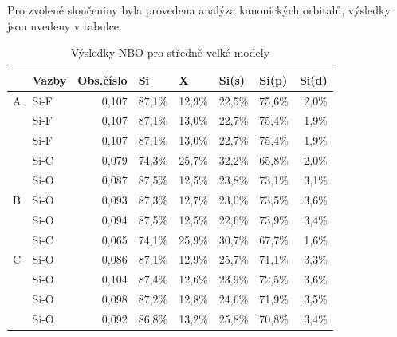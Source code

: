 \documentclass[
  digital, %
  table,   %
  lof,     %
  lot,     %
  oneside,
]{fithesis3}
\begin{document}
Pro zvolené sloučeniny byla provedena analýza kanonických orbitalů, výsledky jsou uvedeny v tabulce.
\begin{table}[htbp]
\caption{Výsledky NBO pro středně velké modely}
\begin{center}
\begin{tabular}{|l|l|r|r|r|r|r|r|}
\hline
 & Vazby & \multicolumn{1}{l|}{Obs.číslo} & \multicolumn{1}{l|}{Si} & \multicolumn{1}{l|}{X} & \multicolumn{1}{l|}{Si(s)} & \multicolumn{1}{l|}{Si(p)} & \multicolumn{1}{l|}{Si(d)} \\ \hline
A  & Si-F & 0,107 & 87,1\% & 12,9\% & 22,5\% & 75,6\% & 2,0\% \\ \hline
 & Si-F & 0,107 & 87,1\% & 13,0\% & 22,7\% & 75,4\% & 1,9\% \\ \hline
 & Si-F & 0,107 & 87,1\% & 13,0\% & 22,7\% & 75,4\% & 1,9\% \\ \hline
 & Si-C & 0,079 & 74,3\% & 25,7\% & 32,2\% & 65,8\% & 2,0\% \\ \hline
 & Si-O & 0,087 & 87,5\% & 12,5\% & 23,8\% & 73,1\% & 3,1\% \\ \hline
B & Si-O & 0,093 & 87,3\% & 12,7\% & 23,0\% & 73,5\% & 3,6\% \\ \hline
 & Si-O & 0,094 & 87,5\% & 12,5\% & 22,6\% & 73,9\% & 3,4\% \\ \hline
 & Si-C & 0,065 & 74,1\% & 25,9\% & 30,7\% & 67,7\% & 1,6\% \\ \hline
C & Si-O & 0,086 & 87,1\% & 12,9\% & 25,7\% & 71,1\% & 3,3\% \\ \hline
 & Si-O & 0,104 & 87,4\% & 12,6\% & 23,9\% & 72,5\% & 3,6\% \\ \hline
 & Si-O & 0,098 & 87,2\% & 12,8\% & 24,6\% & 71,9\% & 3,5\% \\ \hline
 & Si-O & 0,092 & 86,8\% & 13,2\% & 25,8\% & 70,8\% & 3,4\% \\ \hline
\end{tabular}
\end{center}
\label{nbo_middle}
\end{table}
\end{document}
